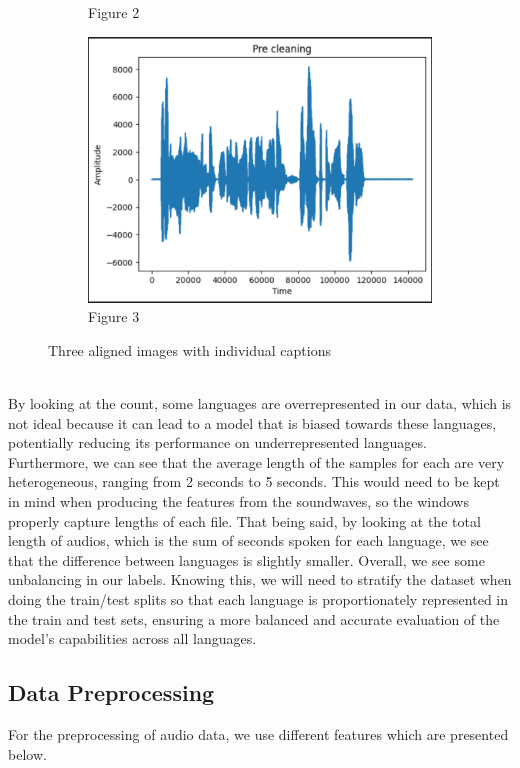 \documentclass[twocolumn]{article}
\begin{document}
\begin{figure}[h]
\begin{subfigure}[b]{0.3\textwidth}
        \caption{Figure 2}
        \label{fig:image2}
    \end{subfigure}
    \hfill
    \begin{subfigure}[b]{0.3\textwidth}
        \centering
        \includegraphics[width=\linewidth]{images/pre_cleaning.png}
        \caption{Figure 3}
        \label{fig:image3}
    \end{subfigure}
    \caption{Three aligned images with individual captions}
    \label{fig:three_images}
\end{figure}\\
By looking at the count, some languages are overrepresented in our data, which is not ideal because it can lead to a model that is biased towards these languages, potentially reducing its performance on underrepresented languages. Furthermore, we can see that the average length of the samples for each are very heterogeneous, ranging from 2 seconds to 5 seconds. This would need to be kept in mind when producing the features from the soundwaves, so the windows properly capture lengths of each file. That being said, by looking at the total length of audios, which is the sum of seconds spoken for each language, we see that the difference between languages is slightly smaller. Overall, we see some unbalancing in our labels. Knowing this, we will need to stratify the dataset when doing the train/test splits so that each language is proportionately represented in the train and test sets, ensuring a more balanced and accurate evaluation of the model's capabilities across all languages.

\subsection{Data Preprocessing}
For the preprocessing of audio data, we use different features which are presented below.
\end{document}
